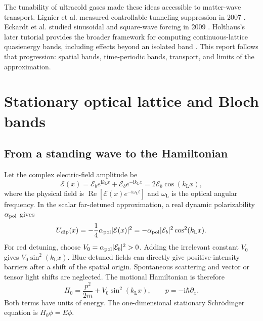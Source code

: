 \documentclass[11pt,oneside]{report}
\numberwithin{equation}{chapter}
\newcommand{\ii}{\mathrm i}
\begin{document}
The tunability of ultracold gases made these ideas accessible to matter-wave transport. Lignier et al. measured controllable tunneling suppression in 2007 \cite{Lignier2007}. Eckardt et al. studied sinusoidal and square-wave forcing in 2009 \cite{Eckardt2009}. Holthaus's later tutorial provides the broader framework for computing continuous-lattice quasienergy bands, including effects beyond an isolated band \cite{Holthaus2016}. This report follows that progression: spatial bands, time-periodic bands, transport, and limits of the approximation.

\chapter{Stationary optical lattice and Bloch bands}
\section{From a standing wave to the Hamiltonian}
Let the complex electric-field amplitude be
\begin{equation}
 \mathcal E(x)=\mathcal E_b e^{\ii k_{\mathrm L}x}+\mathcal E_b e^{-\ii k_{\mathrm L}x}
 =2\mathcal E_b\cos(k_{\mathrm L}x),
\end{equation}
where the physical field is $\operatorname{Re}[\mathcal E(x)e^{-\ii\omega_{\mathrm L}t}]$ and $\omega_{\mathrm L}$ is the optical angular frequency. In the scalar far-detuned approximation, a real dynamic polarizability $\alpha_{\rm pol}$ gives
\begin{equation}
 U_{\rm dip}(x)=-\frac14\alpha_{\rm pol}|\mathcal E(x)|^2
 =-\alpha_{\rm pol}|\mathcal E_b|^2\cos^2(k_{\mathrm L}x).
\end{equation}
For red detuning, choose $V_0=\alpha_{\rm pol}|\mathcal E_b|^2>0$. Adding the irrelevant constant $V_0$ gives $V_0\sin^2(k_{\mathrm L}x)$. Blue-detuned fields can directly give positive-intensity barriers after a shift of the spatial origin. Spontaneous scattering and vector or tensor light shifts are neglected. The motional Hamiltonian is therefore
\begin{equation}\label{eq:H0}
 H_0=\frac{p^2}{2m}+V_0\sin^2(k_{\mathrm L}x),\qquad p=-\ii\hbar\partial_x.
\end{equation}
Both terms have units of energy. The one-dimensional stationary Schr\"odinger equation is $H_0\phi=E\phi$.
\end{document}
